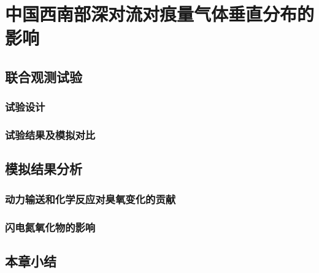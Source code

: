\chapter{中国西南部深对流对痕量气体垂直分布的影响}

\section{联合观测试验}

\subsection{试验设计}
\subsection{试验结果及模拟对比}

\section{模拟结果分析}

\subsection{动力输送和化学反应对臭氧变化的贡献}
\subsection{闪电氮氧化物的影响}

\section{本章小结}
